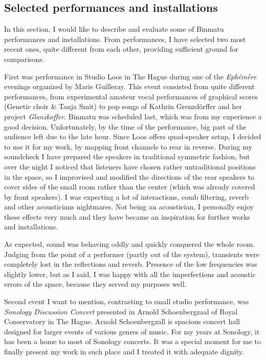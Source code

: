 \documentclass[12pt,a4paper,oneside]{report}
\begin{document}
\subsection{Selected performances and installations} In this section, I would like to describe and evaluate some of Binmatu performances and installations. From performances, I have selected two most recent ones, quite different from each other, providing sufficient ground for comparisons. 

First was performance in Studio Loos in The Hague during one of the \emph{Ephémère} evenings organized by Marie Guilleray. This event consisted from quite different performances, from experimental amateur vocal performances of graphical scores (Genetic choir \& Tanja Smit) to pop songs of Kathrin Grenzdörffer and her project \emph{Glanzkoffer}. Binmatu was scheduled last, which was from my experience a good decision. Unfortunately, by the time of the performance, big part of the audience left due to the late hour. Since Loos offers quad-speaker setup, I decided to use it for my work, by mapping front channels to rear in reverse. During my soundcheck I have prepared the speakers in traditional symmetric fashion, but over the night I noticed that listeners have chosen rather untraditional positions in the space, so I improvised and modified the directions of the rear speakers to cover sides of the small room rather than the center (which was already covered by front speakers). I was expecting a lot of interactions, comb filtering, reverb and other acousticians nightmares. Not being an acoustician, I personally enjoy these effects very much and they have became an inspiration for further works and installations. 

As expected, sound was behaving oddly and quickly conquered the whole room. Judging from the point of a performer (partly out of the system), transients were completely lost in the reflections and reverb. Presence of the low frequencies was slightly lower, but as I said, I was happy with all the imperfections and acoustic errors of the space, because they served my purposes well.

Second event I want to mention, contrasting to small studio performance, was \emph{Sonology Discussion Concert} presented in Arnold Schoenbergzaal of Royal Conservatory in The Hague. Arnold Schoenbergzall is spacious concert hall designed for larger events of various genres of music. For my years at Sonology, it has been a home to most of Sonology concerts. It was a special moment for me to finally present my work in such place and I treated it with adequate dignity.
\end{document}
